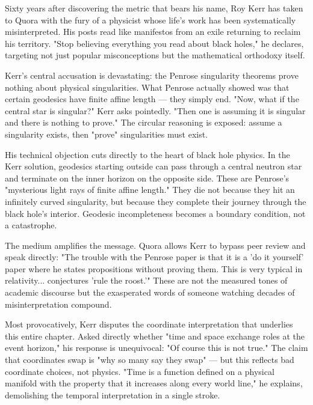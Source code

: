 \begin{commentary}
Sixty years after discovering the metric that bears his name, Roy Kerr has taken to Quora with the fury of a physicist whose life's work has been systematically misinterpreted. His posts read like manifestos from an exile returning to reclaim his territory. "Stop believing everything you read about black holes," he declares, targeting not just popular misconceptions but the mathematical orthodoxy itself.

Kerr's central accusation is devastating: the Penrose singularity theorems prove nothing about physical singularities. What Penrose actually showed was that certain geodesics have finite affine length — they simply end. "Now, what if the central star is singular?" Kerr asks pointedly. "Then one is assuming it is singular and there is nothing to prove." The circular reasoning is exposed: assume a singularity exists, then "prove" singularities must exist.

His technical objection cuts directly to the heart of black hole physics. In the Kerr solution, geodesics starting outside can pass through a central neutron star and terminate on the inner horizon on the opposite side. These are Penrose's "mysterious light rays of finite affine length." They die not because they hit an infinitely curved singularity, but because they complete their journey through the black hole's interior. Geodesic incompleteness becomes a boundary condition, not a catastrophe.

The medium amplifies the message. Quora allows Kerr to bypass peer review and speak directly: "The trouble with the Penrose paper is that it is a 'do it yourself' paper where he states propositions without proving them. This is very typical in relativity... conjectures 'rule the roost.'" These are not the measured tones of academic discourse but the exasperated words of someone watching decades of misinterpretation compound.

Most provocatively, Kerr disputes the coordinate interpretation that underlies this entire chapter. Asked directly whether "time and space exchange roles at the event horizon," his response is unequivocal: "Of course this is not true." The claim that coordinates swap is "why so many say they swap" — but this reflects bad coordinate choices, not physics. "Time is a function defined on a physical manifold with the property that it increases along every world line," he explains, demolishing the temporal interpretation in a single stroke.


\end{commentary}

